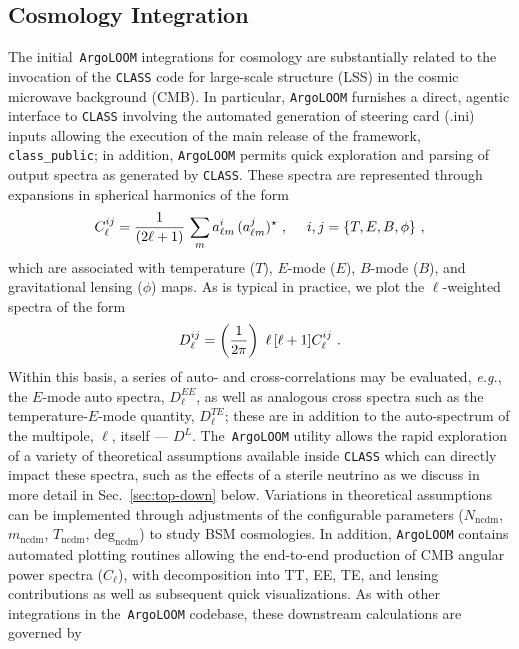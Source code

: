\documentclass[final,3p,times,sort,compress]{elsarticle}
\newcommand{\AL}{\texttt{ArgoLOOM}\xspace}
\newcommand{\CLASS}{\texttt{CLASS}\xspace}
\begin{document}

\subsection{Cosmology Integration}
\label{sec:cosmo}
%
%
The initial~\AL integrations for cosmology are substantially related to the
invocation of the \CLASS code for large-scale structure (LSS) in the cosmic microwave
background (CMB).
%
In particular, \AL furnishes a direct, agentic interface to \CLASS involving the
automated generation of steering card (.ini) inputs allowing the execution of the main release
of the framework, \texttt{class\_public}; in addition, \AL permits quick exploration
and parsing of output spectra as generated by \CLASS.
%
These spectra are represented through expansions in spherical harmonics of the form
%
\begin{equation}
    C^{ij}_\ell = {1 \over (2\ell + 1)}\, \sum_m a^i_{\ell m}\, (a^j_{\ell m})^\star\ , \ \ \ \ i, j = \{T, E, B, \phi\}\ ,
\end{equation}
%
which are associated with temperature ($T$), $E$-mode ($E$), $B$-mode ($B$), and gravitational lensing
($\phi$) maps. As is typical in practice, we plot the $\ell$-weighted spectra of the form
%
\begin{equation}
    D^{ij}_\ell = \left({1 \over 2 \pi}\right)\ \ell\, [\ell +1] C^{ij}_\ell\ .
\label{eq:D-class}
\end{equation}
%
Within this basis, a series of auto- and cross-correlations may be evaluated, {\it e.g.}, the
$E$-mode auto spectra, $D^{EE}_\ell$, as well as analogous cross spectra such as the
temperature-$E$-mode quantity, $D^{TE}_\ell$; these are in addition to the auto-spectrum of the
multipole, $\ell$, itself --- $D^L$.
%
The~\AL utility allows the rapid exploration of a variety of theoretical assumptions available inside
\texttt{CLASS} which can directly impact these spectra, such as the effects of a sterile neutrino as we
discuss in more detail in Sec.~\ref{sec:top-down} below.
%
Variations in theoretical assumptions can be implemented through adjustments
of the configurable parameters ($N_\mathrm{ncdm}$, $m_\mathrm{ncdm}$, $T_\mathrm{ncdm}$,
$\mathrm{deg}_\mathrm{ncdm}$) to study BSM cosmologies.
%
In addition, \texttt{ArgoLOOM} contains automated plotting routines allowing the end-to-end production of
CMB angular power spectra ($C_\ell$), with decomposition into TT, EE, TE, and lensing contributions as
well as subsequent quick visualizations.
%
As with other integrations in the~\AL codebase, these downstream calculations are governed by
\end{document}
